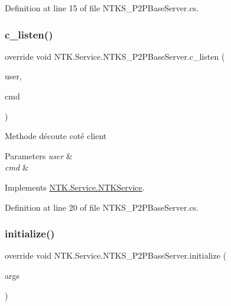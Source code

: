 Definition at line 15 of file N\+T\+K\+S\+\_\+\+P2\+P\+Base\+Server.\+cs.

\mbox{\label{class_n_t_k_1_1_service_1_1_n_t_k_s___p2_p_base_server_a0e5648a55fed5c3b8acd1d3cb14151f8}} 
\subsubsection{\texorpdfstring{c\_listen()}{c\_listen()}}
{\footnotesize\ttfamily override void N\+T\+K.\+Service.\+N\+T\+K\+S\+\_\+\+P2\+P\+Base\+Server.\+c\+\_\+listen (\begin{DoxyParamCaption}\item[{\mbox{\hyperlink{class_n_t_k_1_1_n_t_k_user}{N\+T\+K\+User}}}]{user,  }\item[{String}]{cmd }\end{DoxyParamCaption})\hspace{0.3cm}{\ttfamily [virtual]}}



Methode d\textquotesingle{}écoute coté client 


\begin{DoxyParams}{Parameters}
{\em user} & \\
\hline
{\em cmd} & \\
\hline
\end{DoxyParams}


Implements \mbox{\hyperlink{class_n_t_k_1_1_service_1_1_n_t_k_service_a5f591a8d31f2e2b01fc47a17a4102574}{N\+T\+K.\+Service.\+N\+T\+K\+Service}}.



Definition at line 20 of file N\+T\+K\+S\+\_\+\+P2\+P\+Base\+Server.\+cs.

\mbox{\label{class_n_t_k_1_1_service_1_1_n_t_k_s___p2_p_base_server_af71b704f97741b82231486559af122a7}} 
\subsubsection{\texorpdfstring{initialize()}{initialize()}}
{\footnotesize\ttfamily override void N\+T\+K.\+Service.\+N\+T\+K\+S\+\_\+\+P2\+P\+Base\+Server.\+initialize (\begin{DoxyParamCaption}\item[{params object \mbox{[}$\,$\mbox{]}}]{args }\end{DoxyParamCaption})}



